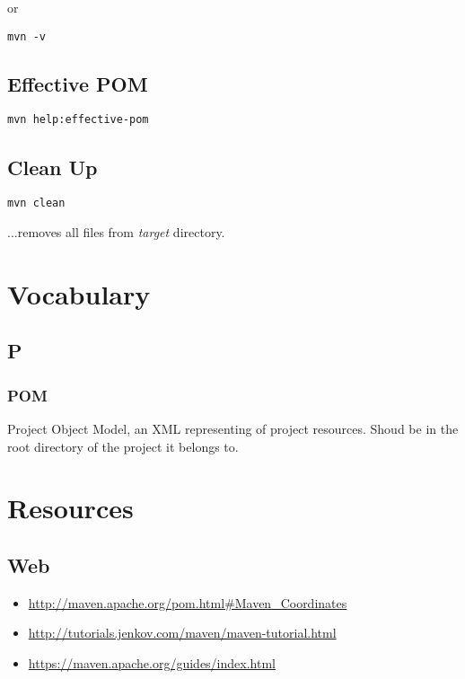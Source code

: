 \documentclass{report}
\begin{document}
or

\begin{verbatim}
mvn -v
\end{verbatim}


\section{Effective POM}
\begin{verbatim}
mvn help:effective-pom
\end{verbatim}

\section{Clean Up}
\begin{verbatim}
mvn clean
\end{verbatim}
...removes all files from \textit{target} directory.



\chapter{Vocabulary}


\section{P}

\subsection{POM}
Project Object Model, an XML representing of project resources. Shoud be in the root directory of the project it belongs to.



\chapter{Resources}


\section{Web}
\begin{itemize}
	\item \url{http://maven.apache.org/pom.html#Maven_Coordinates}
	\item \url{http://tutorials.jenkov.com/maven/maven-tutorial.html}
	\item \url{https://maven.apache.org/guides/index.html}
\end{itemize}
\end{document}
